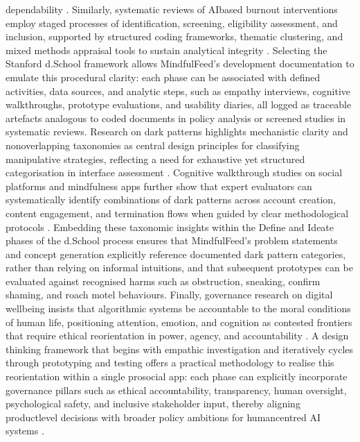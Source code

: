 \documentclass{article}
\begin{document}
dependability \parencites[8]{7808872}. Similarly, systematic reviews of AI\-based burnout interventions employ staged processes of identification, screening, eligibility assessment, and inclusion, supported by structured coding frameworks, thematic clustering, and mixed methods appraisal tools to sustain analytical integrity \parencites[19]{8760542}. Selecting the Stanford d.School framework allows MindfulFeed's development documentation to emulate this procedural clarity: each phase can be associated with defined activities, data sources, and analytic steps, such as empathy interviews, cognitive walkthroughs, prototype evaluations, and usability diaries, all logged as traceable artefacts analogous to coded documents in policy analysis or screened studies in systematic reviews. Research on dark patterns highlights mechanistic clarity and non\-overlapping taxonomies as central design principles for classifying manipulative strategies, reflecting a need for exhaustive yet structured categorisation in interface assessment \parencites[2]{4807303}[2]{5127387}. Cognitive walkthrough studies on social platforms and mindfulness apps further show that expert evaluators can systematically identify combinations of dark patterns across account creation, content engagement, and termination flows when guided by clear methodological protocols \parencites[3]{4692551}[4]{7173856}. Embedding these taxonomic insights within the Define and Ideate phases of the d.School process ensures that MindfulFeed's problem statements and concept generation explicitly reference documented dark pattern categories, rather than relying on informal intuitions, and that subsequent prototypes can be evaluated against recognised harms such as obstruction, sneaking, confirm shaming, and roach motel behaviours. Finally, governance research on digital well\-being insists that algorithmic systems be accountable to the moral conditions of human life, positioning attention, emotion, and cognition as contested frontiers that require ethical reorientation in power, agency, and accountability \parencites[3]{7808872}[4]{7808872}. A design thinking framework that begins with empathic investigation and iteratively cycles through prototyping and testing offers a practical methodology to realise this reorientation within a single pro\-social app: each phase can explicitly incorporate governance pillars such as ethical accountability, transparency, human oversight, psychological safety, and inclusive stakeholder input, thereby aligning product\-level decisions with broader policy ambitions for human\-centred AI systems \parencites[4]{7808872}[6]{5375614}.
\end{document}
